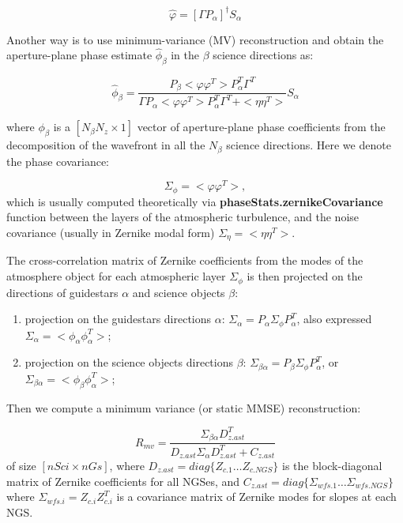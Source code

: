 \documentclass[a4paper,12pt]{article}
\begin{document}
$$\hat{\varphi} = [\Gamma P_\alpha ]^{\dagger} S_\alpha $$

Another way is to use minimum-variance (MV) reconstruction and obtain the aperture-plane phase estimate $\hat{\phi}_\beta$ in the $\beta$ science directions as:

$$\hat{\phi}_\beta = \frac{ P_\beta <\varphi \varphi^T> P_\alpha^T \Gamma^T }{ \Gamma P_\alpha  <\varphi \varphi^T> P_\alpha^T \Gamma^T + <\eta \eta^T > }  S_\alpha $$

where $\phi_\beta$ is a $[N_\beta N_z \times 1]$ vector of aperture-plane phase coefficients from the decomposition of the wavefront in all the $N_\beta$ science directions. Here we denote the phase covariance:

\begin{equation}
\Sigma_\phi = <\varphi \varphi^T>,
\end{equation}
which is usually computed theoretically via \textbf{phaseStats.zernikeCovariance} function between the layers of the atmospheric turbulence, and the noise covariance (usually in Zernike modal form) $\Sigma_\eta =  <\eta \eta^T > $.

The cross-correlation matrix of Zernike coefficients from the modes of the atmosphere object for each atmospheric layer $\Sigma_\phi$ is then projected on the directions of guidestars $\alpha$ and science objects $\beta$:

\begin{enumerate}
 \item projection on the guidestars directions $\alpha$:  $\Sigma_{\alpha} = P_{\alpha}  \Sigma_\phi  P_{\alpha}^T$, also expressed $\Sigma_{\alpha} = <\phi_\alpha \phi_\alpha^T>$;
 \item projection on the science objects directions $\beta$:  $\Sigma_{\beta \alpha} = P_{\beta}  \Sigma_\phi  P_{\alpha}^T$, or $\Sigma_{\beta \alpha} = <\phi_\beta \phi_\alpha^T>$;
\end{enumerate}

Then we compute a minimum variance (or static MMSE) reconstruction:

$$R_{mv} = \frac{\Sigma_{\beta \alpha} D_{z.ast}^T  }{ D_{z.ast} \Sigma_\alpha  D_{z.ast}^T  + C_{z.ast}}$$
of size $[nSci \times nGs]$, where  $D_{z.ast} = diag \{ Z_{c.1} \dots Z_{c.NGS} \}$ is the block-diagonal matrix of Zernike coefficients for all NGSes, and $C_{z.ast} = diag \{ \Sigma_{wfs.1} \dots \Sigma_{wfs.NGS} \}$ where $\Sigma_{wfs.i} = Z_{c.i} Z_{c.i}^T$ is a covariance matrix of Zernike modes for slopes at each NGS.
\end{document}
